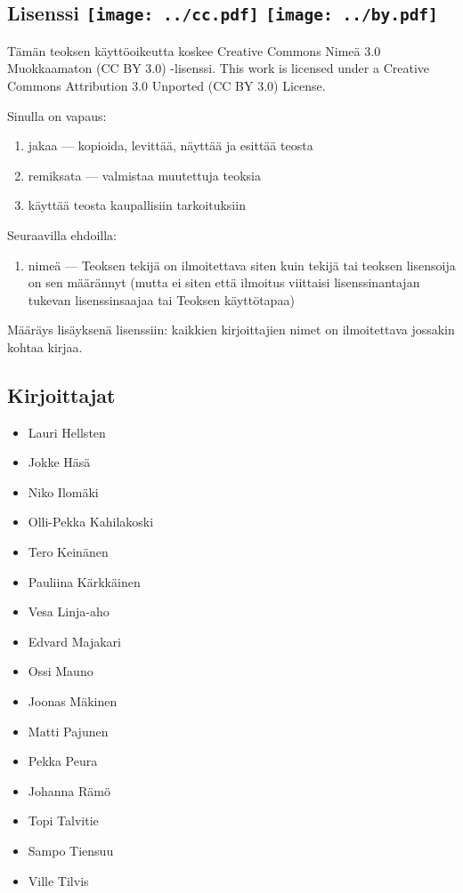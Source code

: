 \subsection*{Lisenssi \texttt{[image: ../cc.pdf]} \texttt{[image: ../by.pdf]}}

Tämän teoksen käyttöoikeutta koskee Creative Commons Nimeä 3.0 Muokkaamaton (CC BY 3.0) -lisenssi.
This work is licensed under a Creative Commons Attribution 3.0 Unported (CC BY 3.0) License.


Sinulla on vapaus:
\begin{enumerate}
\item jakaa — kopioida, levittää, näyttää ja esittää teosta
\item remiksata — valmistaa muutettuja teoksia
\item käyttää teosta kaupallisiin tarkoituksiin
\end{enumerate}
Seuraavilla ehdoilla:
\begin{enumerate}
\item nimeä — Teoksen tekijä on ilmoitettava siten kuin tekijä tai teoksen lisensoija on sen määrännyt (mutta ei siten että ilmoitus viittaisi lisenssinantajan tukevan lisenssinsaajaa tai Teoksen käyttötapaa)
\end{enumerate}

Määräys lisäyksenä lisenssiin: kaikkien kirjoittajien nimet on ilmoitettava jossakin kohtaa kirjaa.



\newpage
\subsection*{Kirjoittajat}
\begin{itemize}
\item Lauri Hellsten
\item Jokke Häsä
\item Niko Ilomäki
\item Olli-Pekka Kahilakoski
\item Tero Keinänen
\item Pauliina Kärkkäinen
\item Vesa Linja-aho
\item Edvard Majakari
\item Ossi Mauno
\item Joonas Mäkinen
\item Matti Pajunen
\item Pekka Peura
\item Johanna Rämö
\item Topi Talvitie
\item Sampo Tiensuu
\item Ville Tilvis
\end{itemize}

